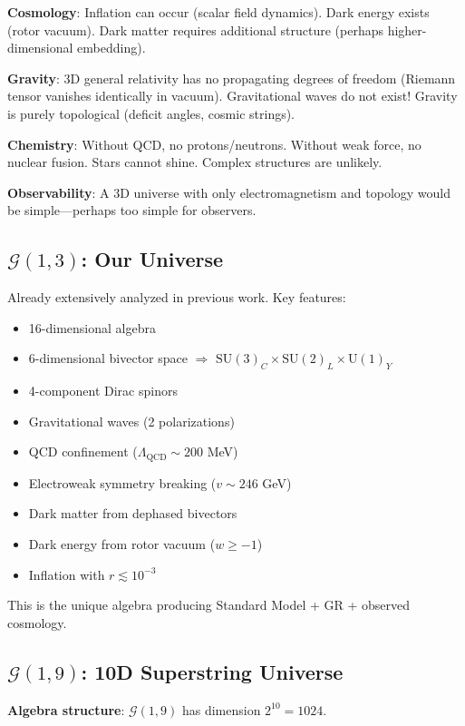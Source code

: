 \documentclass[11pt,a4paper]{article}
\numberwithin{equation}{section}
\theoremstyle{plain}
\theoremstyle{definition}
\theoremstyle{remark}
\newcommand{\Cl}{\mathcal{G}}               %
\begin{document}
\textbf{Cosmology}: Inflation can occur (scalar field dynamics). Dark energy exists (rotor vacuum). Dark matter requires additional structure (perhaps higher-dimensional embedding).

\textbf{Gravity}: 3D general relativity has no propagating degrees of freedom (Riemann tensor vanishes identically in vacuum). Gravitational waves do not exist! Gravity is purely topological (deficit angles, cosmic strings).

\textbf{Chemistry}: Without QCD, no protons/neutrons. Without weak force, no nuclear fusion. Stars cannot shine. Complex structures are unlikely.

\textbf{Observability}: A 3D universe with only electromagnetism and topology would be simple—perhaps too simple for observers.

\subsection{$\Cl(1,3)$: Our Universe}

Already extensively analyzed in previous work. Key features:

\begin{itemize}
\item 16-dimensional algebra
\item 6-dimensional bivector space $\Rightarrow$ $\mathrm{SU}(3)_C \times \mathrm{SU}(2)_L \times \mathrm{U}(1)_Y$
\item 4-component Dirac spinors
\item Gravitational waves (2 polarizations)
\item QCD confinement ($\Lambda_{\text{QCD}} \sim 200$ MeV)
\item Electroweak symmetry breaking ($v \sim 246$ GeV)
\item Dark matter from dephased bivectors
\item Dark energy from rotor vacuum ($w \geq -1$)
\item Inflation with $r \lesssim 10^{-3}$
\end{itemize}

This is the unique algebra producing Standard Model + GR + observed cosmology.

\subsection{$\Cl(1,9)$: 10D Superstring Universe}
\label{sec:highd}

\textbf{Algebra structure}: $\Cl(1,9)$ has dimension $2^{10} = 1024$.
\end{document}

